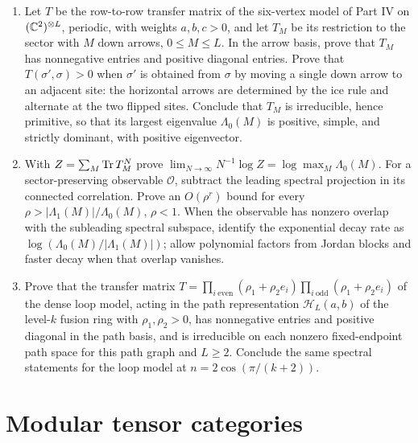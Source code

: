 \begin{exercise}
\leavevmode\par
\begin{enumerate}[label=(\alph*)]
\item Let $T$ be the row-to-row transfer matrix of the six-vertex model of Part IV on $(\mathbb C^2)^{\otimes L}$, periodic, with weights $a,b,c>0$, and let $T_M$ be its restriction to the sector with $M$ down arrows, $0\le M\le L$. In the arrow basis, prove that $T_M$ has nonnegative entries and positive diagonal entries. Prove that $T(\sigma',\sigma)>0$ when $\sigma'$ is obtained from $\sigma$ by moving a single down arrow to an adjacent site: the horizontal arrows are determined by the ice rule and alternate at the two flipped sites. Conclude that $T_M$ is irreducible, hence primitive, so that its largest eigenvalue $\Lambda_0(M)$ is positive, simple, and strictly dominant, with positive eigenvector.
\item With $Z=\sum_M\operatorname{Tr} T_M^N$ prove
$\lim_{N\to\infty}N^{-1}\log Z=\log\max_M\Lambda_0(M)$.
For a sector-preserving observable $\mathcal O$, subtract the
leading spectral projection in its connected correlation.
Prove an $O(\rho^r)$ bound for every
$\rho>|\Lambda_1(M)|/\Lambda_0(M)$, $\rho<1$.
When the observable has nonzero overlap with the subleading
spectral subspace, identify the exponential decay rate as
$\log(\Lambda_0(M)/|\Lambda_1(M)|)$; allow polynomial factors
from Jordan blocks and faster decay when that overlap vanishes.
\item Prove that the transfer matrix $T=\prod_{i\ \mathrm{even}}(\rho_1+\rho_2e_i)\prod_{i\ \mathrm{odd}}(\rho_1+\rho_2e_i)$ of the dense loop model, acting in the path representation $\mathcal H_L(a,b)$ of the level-$k$ fusion ring with $\rho_1,\rho_2>0$, has nonnegative entries and positive diagonal in the path basis, and is irreducible on each nonzero fixed-endpoint path space for this path graph and $L\ge2$. Conclude the same spectral statements for the loop model at $n=2\cos(\pi/(k+2))$.
\end{enumerate}
\end{exercise}

\section{Modular tensor categories}

